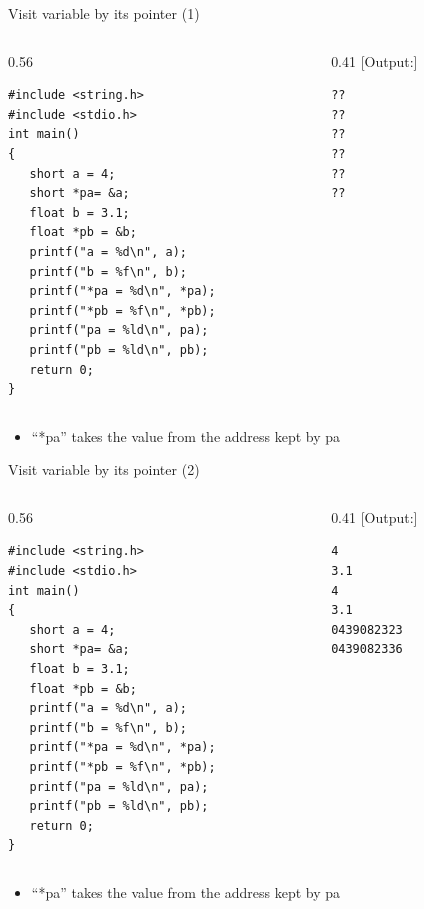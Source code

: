 \begin{frame}[fragile]{Visit variable by its pointer (1)}
\vspace{-0.15in}
\begin{columns}
\begin{column}{0.56\linewidth}
\begin{lstlisting}[xleftmargin=0.05\linewidth, linewidth=0.95\linewidth]
#include <string.h>
#include <stdio.h>
int main()
{
   short a = 4;
   short *pa= &a;
   float b = 3.1;
   float *pb = &b;
   printf("a = %d\n", a);
   printf("b = %f\n", b);
   printf("*pa = %d\n", *pa);
   printf("*pb = %f\n", *pb);
   printf("pa = %ld\n", pa);
   printf("pb = %ld\n", pb);
   return 0;
}
\end{lstlisting}
\end{column}
\begin{column}{0.41\linewidth}
[Output:]
\begin{lstlisting}
??
??
??
??
??
??
\end{lstlisting}
\end{column}
\end{columns}
\vspace{-0.1in}
\begin{itemize}
	\item {``*pa'' takes the value from the address kept by pa}
\end{itemize}
\end{frame}


\begin{frame}[fragile]{Visit variable by its pointer (2)}
\vspace{-0.15in}
\begin{columns}
\begin{column}{0.56\linewidth}
\begin{lstlisting}[xleftmargin=0.02\linewidth, linewidth=0.98\linewidth]
#include <string.h>
#include <stdio.h>
int main()
{
   short a = 4;
   short *pa= &a;
   float b = 3.1;
   float *pb = &b;
   printf("a = %d\n", a);
   printf("b = %f\n", b);
   printf("*pa = %d\n", *pa);
   printf("*pb = %f\n", *pb);
   printf("pa = %ld\n", pa);
   printf("pb = %ld\n", pb);
   return 0;
}
\end{lstlisting}
\end{column}
\begin{column}{0.41\linewidth}
[Output:]
\begin{lstlisting}
4
3.1
4
3.1
0439082323
0439082336
\end{lstlisting}
\end{column}
\end{columns}
\vspace{-0.1in}
\begin{itemize}
	\item {``*pa'' takes the value from the address kept by pa}
\end{itemize}
\end{frame}

